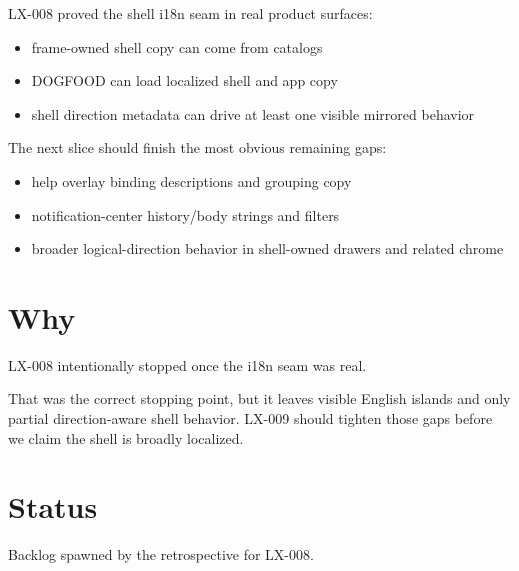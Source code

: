 LX-008 proved the shell i18n seam in real product surfaces:

\begin{itemize}
\tightlist
\item
  frame-owned shell copy can come from catalogs
\item
  DOGFOOD can load localized shell and app copy
\item
  shell direction metadata can drive at least one visible mirrored behavior
\end{itemize}

The next slice should finish the most obvious remaining gaps:

\begin{itemize}
\tightlist
\item
  help overlay binding descriptions and grouping copy
\item
  notification-center history/body strings and filters
\item
  broader logical-direction behavior in shell-owned drawers and related chrome
\end{itemize}

\section{Why}\label{record-361-why}

LX-008 intentionally stopped once the i18n seam was real.

That was the correct stopping point, but it leaves visible English islands and only partial direction-aware shell behavior. LX-009 should tighten those gaps before we claim the shell is broadly localized.

\section{Status}\label{record-361-status}

Backlog spawned by the retrospective for LX-008.

